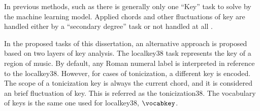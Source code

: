
In previous methods, such as \textcite{chen2018functional,
chen2019harmony, micchi2020not, micchi2021deep,
mcleod2021modular} there is generally only one ``Key'' task
to solve by the machine learning model. Applied chords and
other fluctuations of key are handled either by a
``secondary degree'' task \parencite{chen2021attend,
micchi2021deep} or not handled at all
\parencite{mcleod2021modular}.

In the proposed tasks of this dissertation, an alternative
approach is proposed based on two layers of key analysis.
The \gls{localkey38} task represents the key of a region of
music. By default, any Roman numeral label is interpreted in
reference to the \gls{localkey38}. However, for cases of
tonicization, a different key is encoded. The scope of a
tonicization key is always the current chord, and it is
considered an brief fluctuation of key. This is referred as
the \gls{tonicization38}. The vocabulary of keys is the same
one used for \gls{localkey38}, $\vocabkey$.
